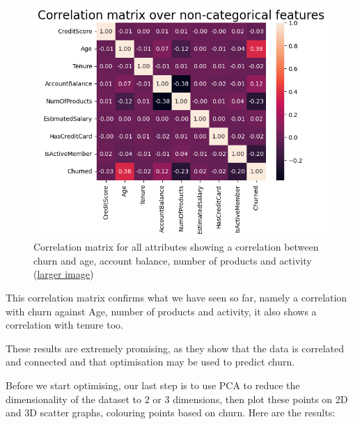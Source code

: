 \documentclass[]{article}
\begin{document}
\begin{figure}[h!]
	\centering
	\includegraphics[scale=0.46]{correlation}
	\caption{Correlation matrix for all attributes showing a correlation between churn and age, account balance, number of products and activity (\href{https://github.com/ray33ee/Understanding-predicting-and-preventing-churn/blob/main/tex/correlation.png?raw=true}{larger image})}
\end{figure}

This correlation matrix confirms what we have seen so far, namely a correlation with churn against Age, number of products and activity, it also shows a correlation with tenure too.

These results are extremely promising, as they show that the data is correlated and connected and that optimisation may be used to predict churn.

Before we start optimising, our last step is to use PCA to reduce the dimensionality of the dataset to 2 or 3 dimensions, then plot these points on 2D and 3D scatter graphs, colouring points based on churn. Here are the results:
\end{document}
